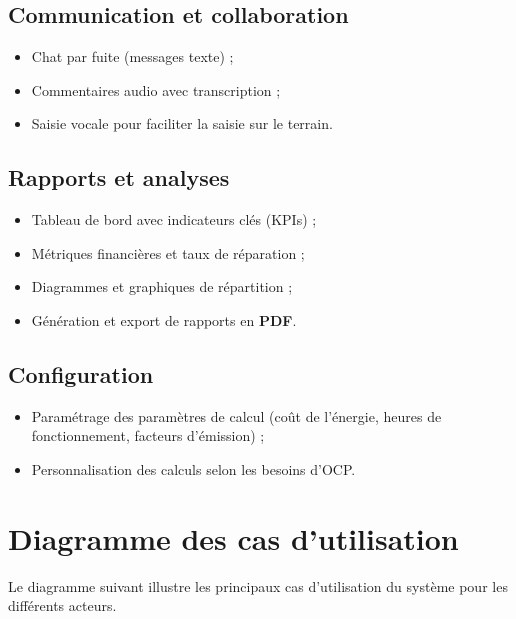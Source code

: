 \documentclass[12pt,a4paper,oneside]{report}
\begin{document}
\subsection{Communication et collaboration}
\begin{itemize}
    \item Chat par fuite (messages texte) ;
    \item Commentaires audio avec transcription ;
    \item Saisie vocale pour faciliter la saisie sur le terrain.
\end{itemize}

\subsection{Rapports et analyses}
\begin{itemize}
    \item Tableau de bord avec indicateurs clés (KPIs) ;
    \item Métriques financières et taux de réparation ;
    \item Diagrammes et graphiques de répartition ;
    \item Génération et export de rapports en \textbf{PDF}.
\end{itemize}

\subsection{Configuration}
\begin{itemize}
    \item Paramétrage des paramètres de calcul (coût de l'énergie, heures de fonctionnement, facteurs d'émission) ;
    \item Personnalisation des calculs selon les besoins d'OCP.
\end{itemize}

\section{Diagramme des cas d'utilisation}

Le diagramme suivant illustre les principaux cas d'utilisation du système pour les différents acteurs.
\end{document}
